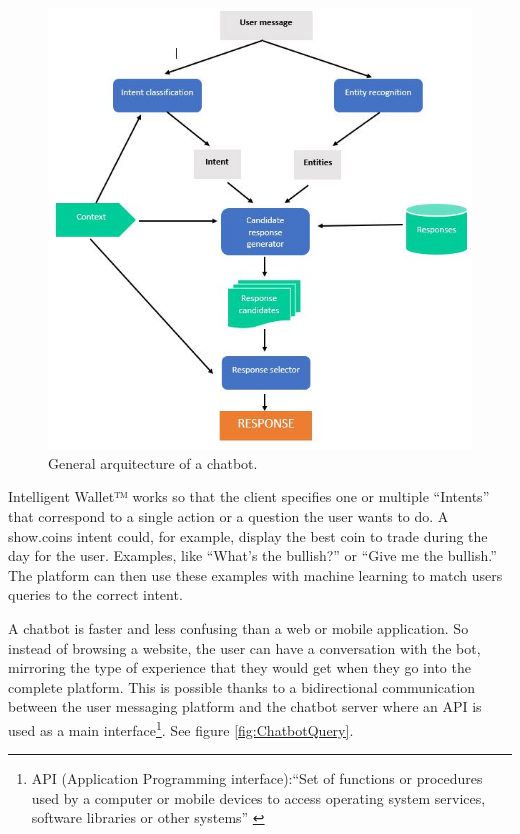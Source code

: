 \documentclass[	DIV=calc,%
							paper=letter,%
							fontsize=12pt%
                            ]{scrartcl}	 					%
\begin{document}
\begin{figure}[H]
\centering
\includegraphics[scale=0.7]{img/ChatbotArquitecture.JPG}
\caption{General arquitecture of a chatbot. \cite{rahman2017programming_08288910}}
\label{ChatbotArquitecture}
\end{figure}



Intelligent Wallet™ works so that the client specifies one or multiple “Intents” that correspond to a single action or a question the user wants to do. A show.coins intent could, for example, display the best coin to trade during the day for the user. Examples, like “What’s the bullish?” or “Give me the bullish.” The platform can then use these examples with machine learning to match users queries to the correct intent.


A chatbot is faster and less confusing than a web or mobile application. So instead of browsing a website, the user can have a conversation with the bot, mirroring the type of experience that they would get when they go into the complete platform. This is possible thanks to a bidirectional communication between the user messaging platform and the chatbot server where an API is used as a main interface\footnote{API (Application Programming interface):``Set of functions or procedures used by a computer or mobile devices to access operating system services, software libraries or other systems'' \cite{ blokdyk2017application}}. See figure \ref{fig:ChatbotQuery}.
\end{document}
